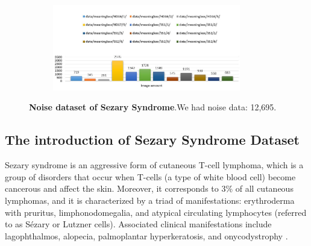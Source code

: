 \begin{figure}[h]
	\begin{center}
		\begin{subfigure}[b]{\textwidth}
		    \centering
			\includegraphics[width=0.9\textwidth]{thesis-template-master/images/noiseofSezarySyndrome.JPG}
			\label{fig:cellnet}
		\end{subfigure}
	\end{center}
	\caption{\textbf{Noise dataset of Sezary Syndrome}.We had noise data: 12,695.}
	\label{fig:4.3}
\end{figure}

\subsection{The introduction of Sezary Syndrome Dataset}
Sezary syndrome is an aggressive form of cutaneous T-cell lymphoma, which is a group of disorders that occur when T-cells (a type of white blood cell) become cancerous and affect the skin\cite{Alain}. Moreover, it corresponds to 3\% of all cutaneous lymphomas, and it is characterized by a triad of manifestations: erythroderma with pruritus, limphonodomegalia, and atypical circulating lymphocytes (referred to as Sézary or Lutzner cells). Associated clinical manifestations include lagophthalmos, alopecia, palmoplantar hyperkeratosis, and onycodystrophy \cite{Yamashita}.


